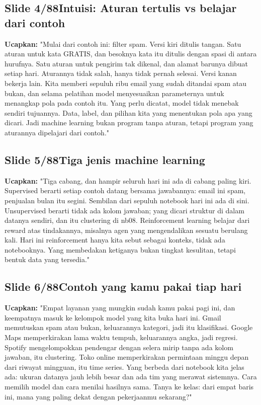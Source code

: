 \documentclass[11pt]{article}
\renewcommand{\framebox}[1]{\colorbox{acc!15}{\textcolor{acc}{\textbf{#1}}}}
\begin{document}
\subsection*{\framebox{Slide 4/88}\quad Intuisi: Aturan tertulis vs belajar dari contoh}
\textbf{Ucapkan:} "Mulai dari contoh ini: filter spam. Versi kiri ditulis tangan. Satu aturan untuk kata GRATIS, dan besoknya kata itu ditulis dengan spasi di antara hurufnya. Satu aturan untuk pengirim tak dikenal, dan alamat barunya dibuat setiap hari. Aturannya tidak salah, hanya tidak pernah selesai. Versi kanan bekerja lain. Kita memberi sepuluh ribu email yang sudah ditandai spam atau bukan, dan selama pelatihan model menyesuaikan parameternya untuk menangkap pola pada contoh itu. Yang perlu dicatat, model tidak menebak sendiri tujuannya. Data, label, dan pilihan kita yang menentukan pola apa yang dicari. Jadi machine learning bukan program tanpa aturan, tetapi program yang aturannya dipelajari dari contoh."\\[2pt]

\subsection*{\framebox{Slide 5/88}\quad Tiga jenis machine learning}
\textbf{Ucapkan:} "Tiga cabang, dan hampir seluruh hari ini ada di cabang paling kiri. Supervised berarti setiap contoh datang bersama jawabannya: email ini spam, penjualan bulan itu segini. Sembilan dari sepuluh notebook hari ini ada di sini. Unsupervised berarti tidak ada kolom jawaban; yang dicari struktur di dalam datanya sendiri, dan itu clustering di nb08. Reinforcement learning belajar dari reward atas tindakannya, misalnya agen yang mengendalikan sesuatu berulang kali. Hari ini reinforcement hanya kita sebut sebagai konteks, tidak ada notebooknya. Yang membedakan ketiganya bukan tingkat kesulitan, tetapi bentuk data yang tersedia."\\[2pt]

\subsection*{\framebox{Slide 6/88}\quad Contoh yang kamu pakai tiap hari}
\textbf{Ucapkan:} "Empat layanan yang mungkin sudah kamu pakai pagi ini, dan keempatnya masuk ke kelompok model yang kita buka hari ini. Gmail memutuskan spam atau bukan, keluarannya kategori, jadi itu klasifikasi. Google Maps memperkirakan lama waktu tempuh, keluarannya angka, jadi regresi. Spotify mengelompokkan pendengar dengan selera mirip tanpa ada kolom jawaban, itu clustering. Toko online memperkirakan permintaan minggu depan dari riwayat mingguan, itu time series. Yang berbeda dari notebook kita jelas ada: ukuran datanya jauh lebih besar dan ada tim yang merawat sistemnya. Cara memilih model dan cara menilai hasilnya sama. Tanya ke kelas: dari empat baris ini, mana yang paling dekat dengan pekerjaanmu sekarang?"\\[2pt]
\end{document}

